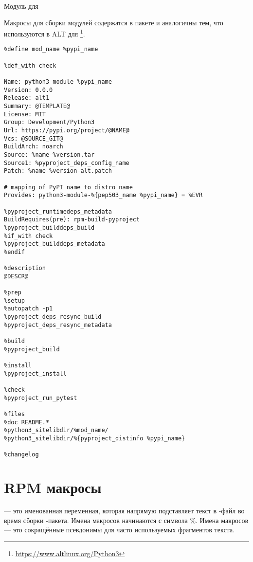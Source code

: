  Модуль для 
	
	Макросы для сборки модулей  содержатся в пакете  и
	аналогичны тем, что используются в ALT для \footnote{\href{https://www.altlinux.org/Python3}{https://www.altlinux.org/Python3}}.
\begin{Verbatim}[breaklines=true,breakanywhere=true,fontsize=\scriptsize]
%define pypi_name @NAME@
%define mod_name %pypi_name
		
%def_with check
		
Name: python3-module-%pypi_name
Version: 0.0.0
Release: alt1
Summary: @TEMPLATE@
License: MIT
Group: Development/Python3
Url: https://pypi.org/project/@NAME@
Vcs: @SOURCE_GIT@
BuildArch: noarch
Source: %name-%version.tar
Source1: %pyproject_deps_config_name
Patch: %name-%version-alt.patch
		
# mapping of PyPI name to distro name
Provides: python3-module-%{pep503_name %pypi_name} = %EVR
		
%pyproject_runtimedeps_metadata
BuildRequires(pre): rpm-build-pyproject
%pyproject_builddeps_build
%if_with check
%pyproject_builddeps_metadata
%endif
		
%description
@DESCR@
	
%prep
%setup
%autopatch -p1
%pyproject_deps_resync_build
%pyproject_deps_resync_metadata
		
%build
%pyproject_build
		
%install
%pyproject_install
		
%check
%pyproject_run_pytest
		
%files
%doc README.*
%python3_sitelibdir/%mod_name/
%python3_sitelibdir/%{pyproject_distinfo %pypi_name}
		
%changelog
\end{Verbatim}

\section{RPM макросы}
 --- это именованная переменная, которая напрямую подставляет текст в -файл
во время сборки -пакета. Имена макросов начинаются с символа \%. Имена макросов --- это
сокращённые псевдонимы для часто используемых фрагментов текста.
	

